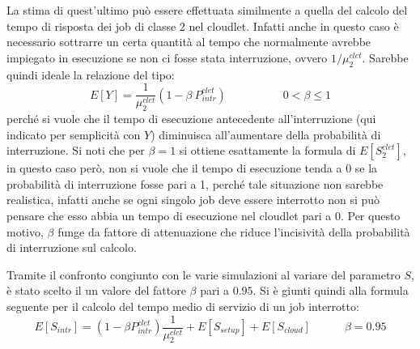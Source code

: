 La stima di quest'ultimo può essere effettuata similmente a quella del calcolo
del tempo di risposta dei job di classe 2 nel cloudlet. Infatti anche in questo
caso è necessario sottrarre un certa quantità al tempo che normalmente avrebbe
impiegato in esecuzione se non ci fosse stata interruzione, ovvero
$1/\mu_2^{clet}$. Sarebbe quindi ideale la relazione del tipo:
\begin{displaymath}
E[Y] = \frac{1}{\mu_2^{clet}}(1 - \beta \ P_{intr}^{clet})
\qquad\quad\qquad 0 < \beta \leq 1
\end{displaymath}
perché si vuole che il tempo di esecuzione antecedente all'interruzione (qui
indicato per semplicità con $Y$) diminuisca all'aumentare della probabilità di
interruzione. Si noti che per $\beta = 1$ si ottiene esattamente la formula di
$E[S_2^{clet}]$, in questo caso però, non si vuole che il tempo di esecuzione
tenda a 0 se la probabilità di interruzione fosse pari a 1, perché tale
situazione non sarebbe realistica, infatti anche se ogni singolo job deve essere
interrotto non si può pensare che esso abbia un tempo di esecuzione nel cloudlet
pari a 0. Per questo motivo, $\beta$ funge da fattore di attenuazione che riduce
l'incisività della probabilità di interruzione sul calcolo.

Tramite il confronto congiunto con le varie simulazioni al variare del parametro
$S$, è stato scelto il un valore del fattore $\beta$ pari a $0.95$. Si è giunti
quindi alla formula seguente per il calcolo del tempo medio di servizio di un
job interrotto:
\begin{equation}
E[S_{intr}] = 
(1 - \beta P_{intr}^{clet}) \frac{1}{\mu_2^{clet}} + E[S_{setup}] + E[S_{cloud}]
\qquad\quad \beta = 0.95
\end{equation}

